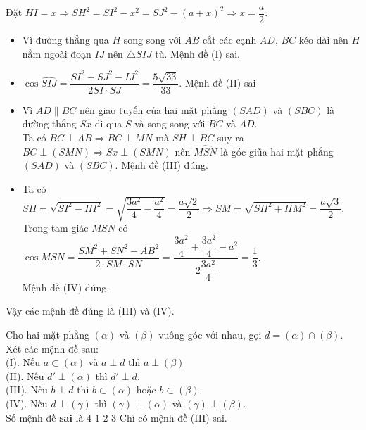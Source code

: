 \begin{ex}
{		Đặt $HI=x\Rightarrow SH^2=SI^2-x^2=SJ^2-(a+x)^2\Rightarrow x=\dfrac{a}{2}.$
		\begin{itemize}
			\item Vì đường thẳng qua $H$ song song với $AB$ cắt các cạnh $AD$, $BC$ kéo dài nên $H$ nằm ngoài đoạn $IJ$ nên $\triangle SIJ$ tù. Mệnh đề (I) sai.
			\item $\cos \widehat{SIJ}=\dfrac{SI^2+SJ^2-IJ^2}{2SI\cdot SJ}=\dfrac{5\sqrt{33}}{33}$. Mệnh đề (II) sai
			\item Vì $AD\parallel BC$ nên giao tuyến của hai mặt phẳng $(SAD)$ và $(SBC)$ là đường thẳng $Sx$ đi qua $S$ và song song với $BC$ và $AD$.\\
			Ta có $BC\perp AB\Rightarrow BC\perp MN$ mà $SH\perp BC$ suy ra $BC\perp (SMN)\Rightarrow Sx\perp (SMN)$ nên $\widehat{MSN}$ là góc giũa hai mặt phẳng $(SAD)$ và $(SBC)$. Mệnh đề (III) đúng.
			\item Ta có $SH=\sqrt{SI^2-HI^2}=\sqrt{\dfrac{3a^2}{4}-\dfrac{a^2}{4}}=\dfrac{a\sqrt{2}}{2}\Rightarrow SM=\sqrt{SH^2+HM^2}=\dfrac{a\sqrt{3}}{2}$.\\
			Trong tam giác $MSN$ có $\cos \widehat{MSN}=\dfrac{SM^2+SN^2-AB^2}{2\cdot SM\cdot SN}=\dfrac{\dfrac{3a^2}{4}+\dfrac{3a^2}{4}-a^2}{2\dfrac{3a^2}{4}}=\dfrac{1}{3}$.\\
			Mệnh đề (IV) đúng.
		\end{itemize}
		Vậy các mệnh đề đúng là (III) và (IV).
	}
\end{ex}

\begin{ex}%
	Cho hai mặt phẳng $(\alpha)$ và $(\beta)$ vuông góc với nhau, gọi $d=(\alpha)\cap (\beta)$. Xét các mệnh đề sau:\\
		(I). Nếu $a\subset (\alpha)$ và $a\perp d$ thì $a\perp (\beta)$\\
		(II). Nếu $d'\perp (\alpha)$ thì $d'\perp d$.\\
		(III). Nếu $b\perp d$ thì $b\subset (\alpha)$ hoặc $b\subset (\beta)$.\\
		(IV). Nếu $d\perp (\gamma)$ thì $(\gamma)\perp (\alpha)$ và $(\gamma)\perp (\beta)$.\\
	Số mệnh đề \textbf{sai} là
	\choice
	{$4$}
	{\True $1$}
	{$2$}
	{$3$}
	\loigiai
	{
		Chỉ có mệnh đề (III) sai.
	}
\end{ex}

